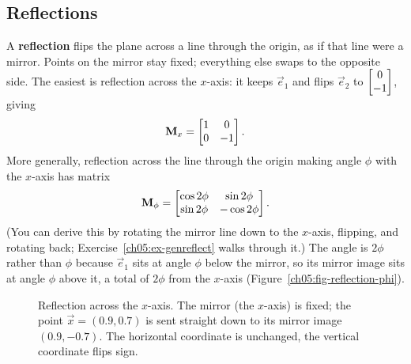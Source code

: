 \subsection{Reflections}
\label{ch05:reflections}

A \textbf{reflection} flips the plane across a line through the origin, as if that
line were a mirror. Points on the mirror stay fixed; everything else swaps to the
opposite side. The easiest is reflection across the $x$-axis: it keeps
$\vec{e}_1$ and flips $\vec{e}_2$ to $\begin{bmatrix}0\\-1\end{bmatrix}$, giving
\[
  \mathbf{M}_x = \begin{bmatrix} 1 & 0 \\ 0 & -1 \end{bmatrix}.
\]
More generally, reflection across the line through the origin making angle
$\phi$ with the $x$-axis has matrix
\[
  \mathbf{M}_\phi = \begin{bmatrix} \cos 2\phi & \sin 2\phi \\ \sin 2\phi & -\cos 2\phi \end{bmatrix}.
\]
(You can derive this by rotating the mirror line down to the $x$-axis, flipping,
and rotating back; Exercise~\ref{ch05:ex-genreflect} walks through it.) The
angle is $2\phi$ rather than $\phi$ because $\vec{e}_1$ sits at angle $\phi$ below
the mirror, so its mirror image sits at angle $\phi$ above it, a total of $2\phi$
from the $x$-axis (Figure~\ref{ch05:fig-reflection-phi}).

\begin{figure}[H]
\centering
{}
\caption{Reflection across the $x$-axis. The mirror (the $x$-axis) is fixed; the
point $\vec{x}=(0.9,0.7)$ is sent straight down to its mirror image $(0.9,-0.7)$.
The horizontal coordinate is unchanged, the vertical coordinate flips sign.}
\label{ch05:fig-reflection}
\end{figure}

